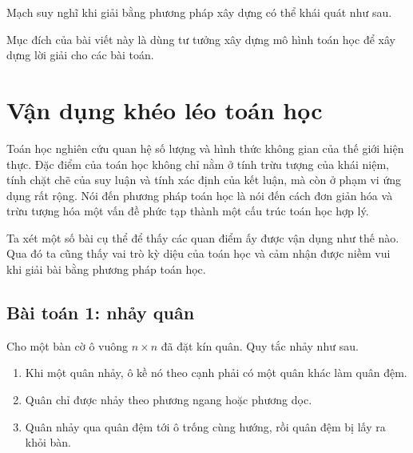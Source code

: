 \documentclass[11pt]{article}
\newcommand{\problem}[1]{\subsection*{#1}}
\begin{document}
Mạch suy nghĩ khi giải bằng phương pháp xây dựng có thể khái quát như sau.

\begin{center}
\end{center}

Mục đích của bài viết này là dùng tư tưởng xây dựng mô hình toán học để xây
dựng lời giải cho các bài toán.

\section{Vận dụng khéo léo toán học}

Toán học nghiên cứu quan hệ số lượng và hình thức không gian của thế giới
hiện thực. Đặc điểm của toán học không chỉ nằm ở tính trừu tượng của khái
niệm, tính chặt chẽ của suy luận và tính xác định của kết luận, mà còn ở phạm
vi ứng dụng rất rộng. Nói đến phương pháp toán học là nói đến cách đơn giản
hóa và trừu tượng hóa một vấn đề phức tạp thành một cấu trúc toán học hợp lý.

Ta xét một số bài cụ thể để thấy các quan điểm ấy được vận dụng như thế nào.
Qua đó ta cũng thấy vai trò kỳ diệu của toán học và cảm nhận được niềm vui
khi giải bài bằng phương pháp toán học.

\problem{Bài toán 1: nhảy quân}

Cho một bàn cờ ô vuông $n\times n$ đã đặt kín quân. Quy tắc nhảy như sau.

\begin{enumerate}
  \item Khi một quân nhảy, ô kề nó theo cạnh phải có một quân khác làm quân
  đệm.
  \item Quân chỉ được nhảy theo phương ngang hoặc phương dọc.
  \item Quân nhảy qua quân đệm tới ô trống cùng hướng, rồi quân đệm bị lấy ra
  khỏi bàn.
\end{enumerate}
\end{document}
